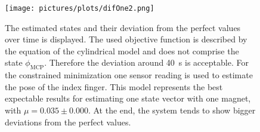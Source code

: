 \begin{figure}[!htb]
\centering
\texttt{[image: pictures/plots/difOne2.png]}
\caption[Estimated states vs. perfect states for using one magnet, one sensor.]
{The estimated states and their deviation from the perfect values over time is displayed. The used objective function is described by the equation of the cylindrical model and does not comprise the state $ \phi_{\mathrm{MCP}} $. Therefore the deviation around \SI{40}{\second} is acceptable. For the constrained minimization one sensor reading is used to estimate the pose of the index finger. This model represents the best expectable results for estimating one state vector with one magnet, with $ \mu = 0.035 \pm 0.000 $. At the end, the system tends to show bigger deviations from the perfect values.}
\label{fig:11cylNa1}
\end{figure}
\FloatBarrier

